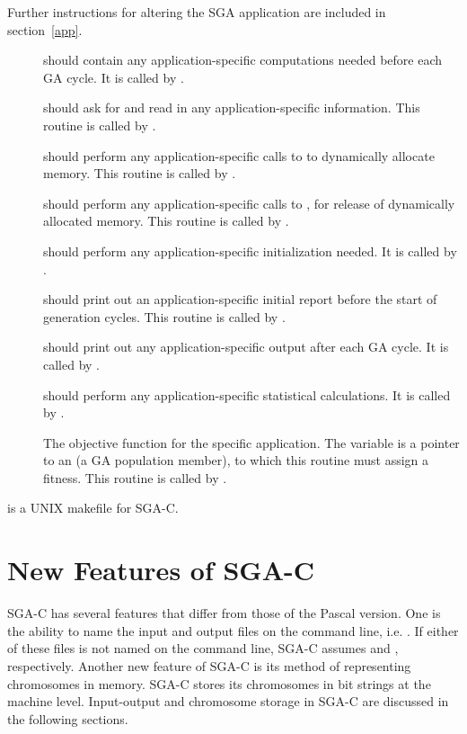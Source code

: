 \begin{description}
Further instructions for altering the SGA application are 
included in section~\ref{app}.
\begin{description}
\item[{}] should contain any application-specific computations
needed before each GA cycle.  It is called by {}.
\item[{}] should ask for and read in any application-specific 
information.  This routine is 
called by {}.
\item[{}] should perform any application-specific calls to 
{} to dynamically allocate memory.  This routine is 
called by {}.
\item[{}]  should perform any application-specific calls to 
{}, for release of dynamically allocated memory.  
This routine is called by {}.
\item[{}] should perform any application-specific initialization
needed.  It is called by {}.
\item[{}] should print out an application-specific initial
report before the start of generation cycles.  This routine is 
called by {}.
\item[{}]  should print out any application-specific  
output 
after each GA cycle.  It is called by {}.
\item[{}]  should perform any application-specific statistical
calculations.  It is called by {}.
\item[{}]  The objective function for the specific application.
The variable {} is a pointer to an {} 
(a GA population member), to which this routine must assign a fitness.
This routine is called by {}.
\end{description}
\item[{\btt{Makefile}}] is a UNIX makefile for SGA-C.  
\end{description}

\section{New Features of SGA-C}
SGA-C has several features that differ from those of the Pascal version.
One is the ability to name the input and output files on the command line, i.e.
{}.  If either of these files is not named on the command line, 
SGA-C assumes 
{} and {}, respectively.  
Another new feature of SGA-C is its method of representing
chromosomes in memory.
SGA-C stores its chromosomes in bit strings at the machine level. 
Input-output and chromosome storage in SGA-C are discussed in the following sections.

